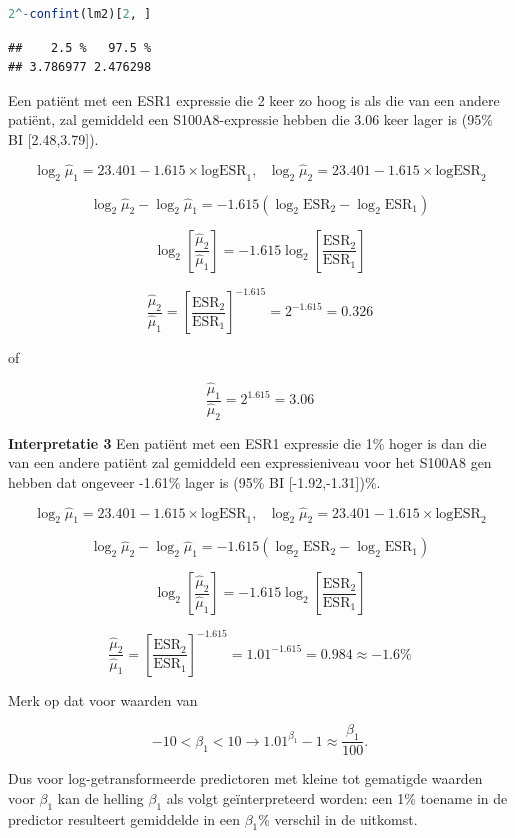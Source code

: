 \documentclass[
  12pt,dutch,coursenotes]{book}
\begin{document}
\begin{lstlisting}[language=R]
2^-confint(lm2)[2, ]
\end{lstlisting}

\begin{lstlisting}
##    2.5 %   97.5 % 
## 3.786977 2.476298
\end{lstlisting}

Een patiënt met een ESR1 expressie die 2 keer zo hoog is als die van een andere patiënt, zal gemiddeld een S100A8-expressie hebben die 3.06 keer lager is (95\% BI {[}2.48,3.79{]}).

\[\log_2 \hat\mu_1=23.401  -1.615 \times \text{logESR}_1,\text{ } \log_2 \hat\mu_2=23.401  -1.615 \times \text{logESR}_2 \]

\[\log_2 \hat\mu_2-\log_2 \hat\mu_1=  -1.615 (\log_2 \text{ESR}_2-\log_2 \text{ESR}_1) \]

\[\log_2 \left[\frac{\hat\mu_2}{\hat\mu_1}\right]=  -1.615 \log_2\left[\frac{ \text{ESR}_2}{\text{ESR}_1}\right] \]

\[\frac{\hat\mu_2}{\hat\mu_1}=\left[\frac{ \text{ESR}_2}{\text{ESR}_1}\right]^{-1.615}=2^ {-1.615} =0.326\]

of

\[\frac{\hat\mu_1}{\hat\mu_2}=2^{1.615} =3.06\]

\textbf{Interpretatie 3}
Een patiënt met een ESR1 expressie die 1\% hoger is dan die van een andere patiënt zal gemiddeld een expressieniveau voor het S100A8 gen hebben dat ongeveer -1.61\% lager is (95\% BI {[}-1.92,-1.31{]})\%.

\[\log_2 \hat\mu_1=23.401  -1.615 \times \text{logESR}_1,\text{ } \log_2 \hat\mu_2=23.401  -1.615 \times \text{logESR}_2 \]

\[\log_2 \hat\mu_2-\log_2 \hat \mu_1=  -1.615 (\log_2 \text{ESR}_2-\log_2 \text{ESR}_1) \]

\[\log_2 \left[\frac{\hat\mu_2}{\hat\mu_1}\right]=  -1.615 \log_2\left[\frac{ \text{ESR}_2}{\text{ESR}_1}\right] \]

\[\frac{\hat\mu_2}{\hat\mu_1}=\left[\frac{ \text{ESR}_2}{\text{ESR}_1}\right]^{-1.615}=1.01^ {-1.615} =0.984 \approx -1.6\%\]

Merk op dat voor waarden van

\[−10< \beta_1<10 \rightarrow 1.01 ^{\beta_1}−1 \approx \frac{\beta_1}{100}.\]

Dus voor log-getransformeerde predictoren met kleine tot gematigde waarden voor \(\beta_1\) kan de helling \(\beta_1\) als volgt geïnterpreteerd worden: een 1\% toename in de predictor resulteert gemiddelde in een \(\beta_1\)\% verschil in de uitkomst.
\end{document}
